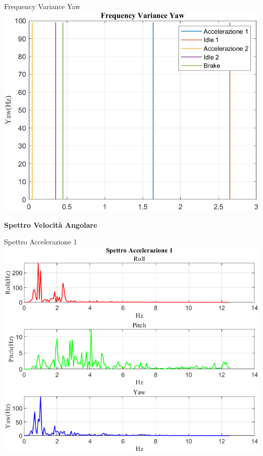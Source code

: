 \documentclass[beamer]{standalone}
\begin{document}
	\begin{frame}{{Frequency Variance Yaw}}
		\centering\includegraphics[height=.8\textheight]{figure/VAng/Trasformata/Frequency VarianceYaw}
	\end{frame}
	
	\begin{frame}
		\color{blue}\centering\huge{\textbf{Spettro Velocità Angolare}}
	\end{frame}
	
	\begin{frame}{{Spettro Accelerazione 1}}
		\centering\includegraphics[height=.8\textheight]{figure/VAng/Trasformata/Spettro Accelerazione 1}
	\end{frame}
	
\end{document}
